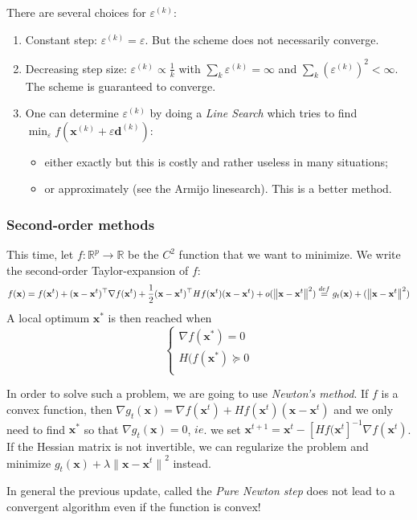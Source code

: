 \documentclass[12pt]{report}	%
\def\ts{\top}
\def\xb{\mathbf{x}}
\def\db{\mathbf{d}}
\begin{document}
There are several choices for $\varepsilon^{(k)}$:
\begin{enumerate}
\item Constant step: $\varepsilon^{(k)}=\varepsilon$. But the scheme does not necessarily converge.
\item Decreasing step size: $\varepsilon^{(k)}\propto\frac{1}{k}$
with $\sum_{k}{\varepsilon^{(k)}}=\infty$ and $\sum_{k}{(\varepsilon^{(k)})^{2}}<\infty$. The scheme is guaranteed to converge.
\item One can determine $\varepsilon^{(k)}$ by doing a \emph{Line Search} which tries to find $\min_{\varepsilon}f(\xb^{(k)}+\varepsilon \db^{(k)})$: 
\begin{itemize}
\item either exactly but this is costly and rather useless in many situations; 
\item or approximately (see the Armijo linesearch). This is a better method. 
\end{itemize}
\end{enumerate}

\subsubsection{Second-order methods}
This time, let  $f:\mathbb{R}^p \rightarrow \mathbb{R}$ be the  $C^{2}$ function that we want to minimize. We write the second-order Taylor-expansion of $f$:
$$
f(\xb)=f(\xb^t)+(\xb-\xb^t)^{\ts}\nabla f(\xb^t)+\frac{1}{2}(\xb-\xb^t)^{\ts} Hf(\xb^t)(\xb-\xb^t)+o(\left \Vert \xb-\xb^t \right \Vert ^2) \\
\overset{def}{=} g_t(\xb) + (\left \Vert \xb-\xb^t \right \Vert ^2)\\
$$
A local optimum $\xb^*$ is then reached when 
$$\begin{cases}
\nabla f(\xb^{*})=0\\
H(f(\xb^{*})\succeq 0\\
\end{cases}$$

In order to solve such a problem, we are going to use \emph{Newton's method}. If $f$ is a convex function, then $\nabla g_t(\xb) = \nabla f(\xb^t) + Hf(\xb^t)(\xb-\xb^t)$ and we only need to find $\xb^{*}$ so that $\nabla g_t(\xb) =0$, $ie$. we set $\xb^{t+1} = \xb^t - [Hf(\xb^t]^{-1}\nabla f(\xb^t)$. If the Hessian matrix is not invertible, we can regularize the problem and minimize $g_t(\xb)+\lambda {\lVert \xb-\xb^t \rVert}^2$ instead.

In general the previous update, called the \emph{Pure Newton step} does not lead to a convergent algorithm even if the function is convex!
\end{document}
